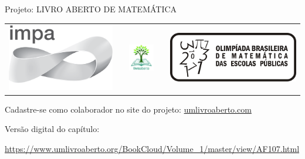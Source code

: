 \begin{center}
Projeto: LIVRO ABERTO DE MATEMÁTICA

\noindent \begin{tabular}{lcccr}
\includegraphics[scale=.15]{impa}& \quad\quad& \includegraphics[width=3cm]{logo} & \quad\quad& \includegraphics[scale=.24]{obmep} 
\end{tabular}
\end{center}

\vspace*{.3cm}

Cadastre-se como colaborador no site do projeto: \url{umlivroaberto.com}

Versão digital do capítulo:

\url{https://www.umlivroaberto.org/BookCloud/Volume_1/master/view/AF107.html}


